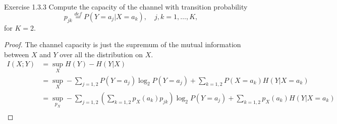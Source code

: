 \documentclass[../main.tex]{subfiles}
\begin{document}
\begin{bbox}{Exercise 1.3.3}
    Compute the capacity of the channel with transition probability \[
    p_{jk} \overset{def}{=} P\left(Y=a_j | X= a_k\right), \quad j,k=1,\dots,K,
    \]
    for $K=2$.
    \begin{proof}
        The channel capacity is just the supremum of the mutual information between $X$ and $Y$ over all the distribution on $X$. 
        \begin{align*}
            I(X;Y) &= \sup_{X}H(Y)-H(Y|X)\\
            &=\sup_{X} -\sum_{j=1,2}P(Y=a_j) \log_2 P(Y=a_j) + \sum_{k=1,2} P(X=a_k)H(Y|X=a_k)\\
            &= \sup_{p_X}-\sum_{j=1,2}(\sum_{k=1,2} p_X(a_k)p_{jk})\log_2 P(Y=a_j) + \sum_{k=1,2}p_X(a_k)H(Y|X=a_k)\\

        \end{align*}
    \end{proof}
\end{bbox}
\end{document}
